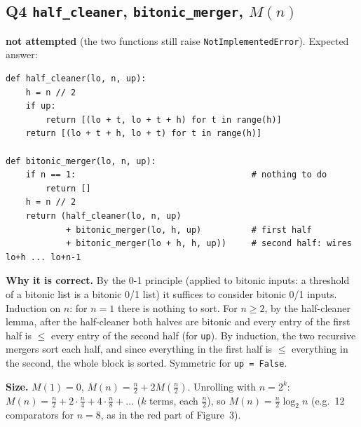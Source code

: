\documentclass[11pt,a4paper]{article}
\newcommand{\pts}[3]{\fcolorbox{#3}{white}{\color{#3}\textbf{#1\,/\,#2}}}
\newcommand{\NONE}{\textcolor{none}{\textbf{not attempted}}}
\begin{document}
\subsection*{Q4 \quad \texttt{half\_cleaner}, \texttt{bitonic\_merger}, $M(n)$ \hfill \pts{0}{4}{none}}
\NONE{} (the two functions still raise \texttt{NotImplementedError}). Expected answer:
\begin{lstlisting}
def half_cleaner(lo, n, up):
    h = n // 2
    if up:
        return [(lo + t, lo + t + h) for t in range(h)]
    return [(lo + t + h, lo + t) for t in range(h)]

def bitonic_merger(lo, n, up):
    if n == 1:                                   # nothing to do
        return []
    h = n // 2
    return (half_cleaner(lo, n, up)
            + bitonic_merger(lo, h, up)          # first half
            + bitonic_merger(lo + h, h, up))     # second half: wires lo+h ... lo+n-1
\end{lstlisting}
\textbf{Why it is correct.} By the 0-1 principle (applied to bitonic inputs: a threshold of a
bitonic list is a bitonic 0/1 list) it suffices to consider bitonic 0/1 inputs. Induction on $n$:
for $n=1$ there is nothing to sort. For $n\ge2$, by the half-cleaner lemma, after the
half-cleaner both halves are bitonic and every entry of the first half is $\le$ every entry of the
second half (for \texttt{up}). By induction, the two recursive mergers sort each half, and since
everything in the first half is $\le$ everything in the second, the whole block is sorted.
Symmetric for \texttt{up = False}.

\textbf{Size.} $M(1)=0$, $M(n)=\frac n2+2M(\frac n2)$. Unrolling with $n=2^k$:
$M(n)=\frac n2+2\cdot\frac n4+4\cdot\frac n8+\dots$ ($k$ terms, each $\frac n2$), so
$\boxed{M(n)=\tfrac n2\log_2 n}$ (e.g.\ 12 comparators for $n=8$, as in the red part of Figure~3).
\end{document}
